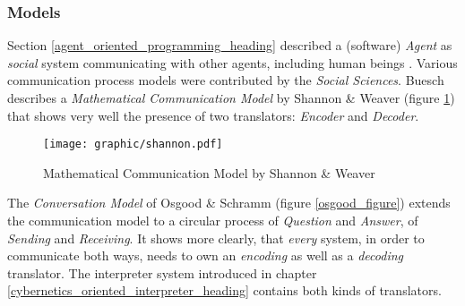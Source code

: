 %
%
%
%
%
%
%

\subsubsection{Models}
\label{models_heading}

Section \ref{agent_oriented_programming_heading} described a (software)
\emph{Agent} as \emph{social} system communicating with other agents, including
human beings \cite[p. 330]{sowa}. Various communication process models were
contributed by the \emph{Social Sciences}. Buesch \cite{buesch} describes a
\emph{Mathematical Communication Model} by Shannon \& Weaver (figure
\ref{shannon_figure}) that shows very well the presence of two translators:
\emph{Encoder} and \emph{Decoder}.

\begin{figure}[ht]
    \begin{center}
        \texttt{[image: graphic/shannon.pdf]}
        \caption{Mathematical Communication Model by Shannon \& Weaver \cite{shannon}}
        \label{shannon_figure}
    \end{center}
\end{figure}

The \emph{Conversation Model} of Osgood \& Schramm (figure \ref{osgood_figure})
extends the communication model to a circular process of \emph{Question} and
\emph{Answer}, of \emph{Sending} and \emph{Receiving}. It shows more clearly,
that \emph{every} system, in order to communicate both ways, needs to own an
\emph{encoding} as well as a \emph{decoding} translator. The interpreter system
introduced in chapter \ref{cybernetics_oriented_interpreter_heading} contains
both kinds of translators.

